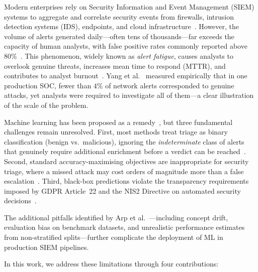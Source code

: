 \documentclass[conference]{IEEEtran}
\begin{document}
Modern enterprises rely on Security Information and Event Management (SIEM) systems
to aggregate and correlate security events from firewalls, intrusion detection systems (IDS),
endpoints, and cloud infrastructure~\cite{tariq2025}.
However, the volume of alerts generated daily---often tens of thousands---far exceeds
the capacity of human analysts, with false positive rates commonly reported above
80\%~\cite{khayat2025,ghadermazi2024}.
This phenomenon, widely known as \emph{alert fatigue}, causes analysts to overlook genuine
threats, increases mean time to respond (MTTR), and contributes to analyst
burnout~\cite{ban2023,alahmadi2020}.
Yang et al.~\cite{yang2024} measured empirically that in one production SOC, fewer than
$4\%$ of network alerts corresponded to genuine attacks, yet analysts were required to
investigate all of them---a clear illustration of the scale of the problem.

Machine learning has been proposed as a remedy~\cite{ring2019,zuech2015},
but three fundamental challenges remain unresolved.
First, most methods treat triage as binary classification (benign vs.\ malicious),
ignoring the \emph{indeterminate} class of alerts that genuinely require additional
enrichment before a verdict can be reached~\cite{sommer2010}.
Second, standard accuracy-maximising objectives are inappropriate for security triage,
where a missed attack may cost orders of magnitude more than a false escalation~\cite{elkan2001}.
Third, black-box predictions violate the transparency requirements imposed by
GDPR Article~22 and the NIS2 Directive on automated security
decisions~\cite{gdpr2016,nis2directive}.

The additional pitfalls identified by Arp et al.~\cite{arp2022}---including
concept drift, evaluation bias on benchmark datasets, and unrealistic performance
estimates from non-stratified splits---further complicate the deployment of ML in
production SIEM pipelines.

In this work, we address these limitations through four contributions:
\end{document}
